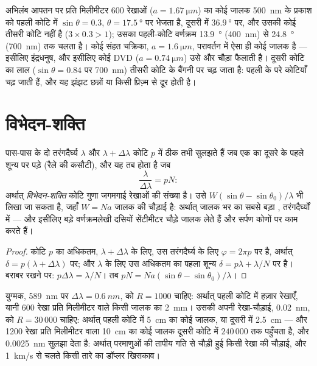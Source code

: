 \begin{example}[कक्षा का कोई जालक और कोई सीडी]\label{ex:b2:gratings:examples}
अभिलंब आपतन पर प्रति मिलीमीटर $600$ रेखाओं ($a = \qty{1.67}{\micro m}$) का कोई जालक
\qty{500}{nm} के प्रकाश को पहली कोटि में $\sin\theta = 0.3$, $\theta = \qty{17.5}{\degree}$ पर
भेजता है, दूसरी में $\qty{36.9}{\degree}$ पर, और उसकी कोई तीसरी कोटि नहीं है
($3 \times 0.3 > 1$); उसका पहली-कोटि वर्णक्रम \qty{13.9}{\degree}
(\qty{400}{nm}) से \qty{24.8}{\degree} (\qty{700}{nm}) तक चलता है। कोई संहत चक्रिका, $a =
\qty{1.6}{\micro m}$, परावर्तन में ऐसा ही कोई जालक है --- इसीलिए इंद्रधनुष,
और इसीलिए कोई DVD ($a = \qty{0.74}{\micro m}$) उसे और चौड़ा फैलाती है।
दूसरी कोटि का लाल ($\sin\theta = 0.84$ पर \qty{700}{nm}) तीसरी कोटि के
बैंगनी पर चढ़ जाता है: पहली के परे कोटियाँ चढ़ जाती हैं, और यह झंझट छन्नों
या किसी प्रिज़्म से दूर होती है।
\end{example}

\section{विभेदन-शक्ति}

\begin{proposition}[किसी जालक की विभेदन-शक्ति]\label{prop:b2:gratings:resolution}
पास-पास के दो तरंगदैर्घ्य $\lambda$ और $\lambda + \Delta\lambda$ कोटि $p$ में ठीक तभी सुलझते हैं
जब एक का  दूसरे के पहले शून्य पर पड़े
(रैले की कसौटी), और यह तब होता है जब
\[
\frac\lambda{\Delta\lambda} = pN :
\]
अर्थात् \emph{विभेदन-शक्ति} कोटि गुणा जगमगाई रेखाओं की
संख्या है। उसे $W(\sin\theta - \sin\theta_0)/\lambda$ भी लिखा जा सकता है, जहाँ $W = Na$ जालक की
चौड़ाई है: अर्थात् जालक भर का सबसे बड़ा ,
तरंगदैर्घ्यों में --- और इसीलिए बड़े वर्णक्रमलेखी दसियों सेंटीमीटर चौड़े
जालक लेते हैं और सर्पण कोणों पर काम करते हैं।
\end{proposition}

\begin{proof}
कोटि $p$ का अधिकतम, $\lambda + \Delta\lambda$ के लिए, उस तरंगदैर्घ्य के लिए $\varphi = 2\pi p$ पर है,
अर्थात् $\delta = p(\lambda + \Delta\lambda)$ पर; और $\lambda$ के लिए उस अधिकतम का पहला शून्य
$\delta = p\lambda + \lambda/N$ पर है। बराबर रखने पर: $p\Delta\lambda = \lambda/N$। तब $pN =
Na(\sin\theta - \sin\theta_0)/\lambda$।
\end{proof}

\begin{example}\label{ex:b2:gratings:sodium}
युग्मक, \qty{589}{nm} पर $\Delta\lambda = \qty{0.6}{nm}$, को $R = 1000$ चाहिए: अर्थात्
पहली कोटि में हज़ार रेखाएँ, यानी \num{600} रेखा प्रति मिलीमीटर वाले किसी
जालक का \qty{2}{mm}। उसकी अपनी रेखा-चौड़ाई, \qty{0.02}{nm}, को $R = 30\,000$ चाहिए: अर्थात् पहली कोटि में \qty{5}{cm} का कोई
जालक, या दूसरी में \qty{2.5}{cm} --- और
\num{1200} रेखा प्रति मिलीमीटर वाला \qty{10}{cm} का कोई जालक दूसरी कोटि में
$240\,000$ तक पहुँचता है, और \qty{0.0025}{nm} सुलझा देता है: अर्थात् परमाणुओं की तापीय गति से
चौड़ी हुई किसी रेखा की चौड़ाई, और \qty{1}{km/s} से चलते किसी तारे का
डॉप्लर खिसकाव।
\end{example}

